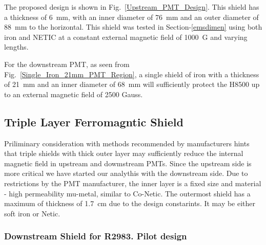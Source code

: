 \documentclass[12pt]{article}
\begin{document}
The proposed design
 is shown  in Fig.~\ref{Upstream_PMT_Design}. This  shield has
 a thickness of 6~mm, with an inner diameter of 76~mm and an outer 
diameter of 88~mm to the horizontal. This shield  was tested 
in Section-\ref{emsdimen} using both iron and NETIC at a constant
 external magnetic field of 1000~G and varying lengths.

For the downstream PMT, as seen from Fig.~\ref{Single_Iron_21mm_PMT_Region}, 
a single shield of iron with a thickness of 21~mm and an
inner diameter of 68~mm will sufficiently protect the H8500 up to an external
magnetic field of 2500 Gauss. 




\newpage
\subsection{Triple Layer Ferromagntic Shield }
Priliminary consideration with  methods recommended by manufacturers
hints  that   triple shields with thick outer layer may  sufficiently reduce 
the internal magnetic field  in upstream and dowmstream PMTs.
Since the upstream side is  more critical we have started our analythis with the downstream  side. 
Due to restrictions by the  PMT manufacturer, the inner layer is a fixed size and 
material - high permeability mu-metal, similar to  Co-Netic. 
The outermost shield has a maximum of thickness of 1.7~cm due to 
the design constarints. It may be either  soft iron or Netic.


\subsubsection{Downstream Shield for R2983. Pilot design}
\end{document}
